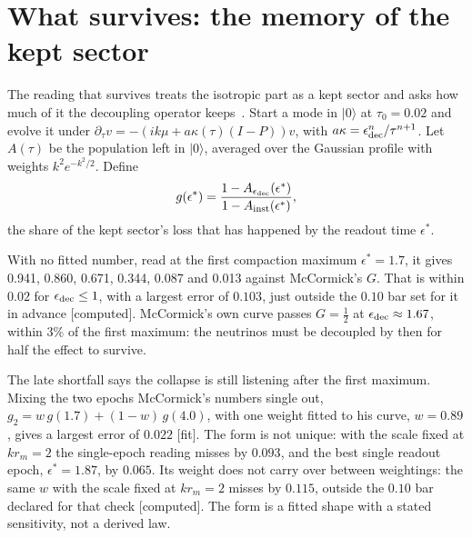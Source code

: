 \documentclass[11pt]{article}
\newcommand{\grade}[1]{\textsf{\small[#1]}}
\begin{document}
\section{What survives: the memory of the kept sector}\label{sec:memory}

The reading that survives treats the isotropic part as a kept sector and asks how much of it the decoupling operator keeps~\cite{WB}. Start a mode in $|0\rangle$ at $\tau_0=0.02$ and evolve it under $\partial_\tau v=-(ik\mu+a\kappa(\tau)(I-P))v$, with $a\kappa=\epsilon_{\rm dec}^n/\tau^{n+1}$. Let $A(\tau)$ be the population left in $|0\rangle$, averaged over the Gaussian profile with weights $k^2e^{-k^2/2}$. Define
\begin{equation}
g(\epsilon^\ast)=\frac{1-A_{\epsilon_{\rm dec}}(\epsilon^\ast)}{1-A_{\rm inst}(\epsilon^\ast)},
\end{equation}
the share of the kept sector's loss that has happened by the readout time $\epsilon^\ast$.

With no fitted number, read at the first compaction maximum $\epsilon^\ast=1.7$, it gives 0.941, 0.860, 0.671, 0.344, 0.087 and 0.013 against McCormick's $G$. That is within $0.02$ for $\epsilon_{\rm dec}\le1$, with a largest error of $0.103$, just outside the $0.10$ bar set for it in advance \grade{computed}. McCormick's own curve passes $G=\tfrac12$ at $\epsilon_{\rm dec}\approx1.67$, within 3\% of the first maximum: the neutrinos must be decoupled by then for half the effect to survive.

The late shortfall says the collapse is still listening after the first maximum. Mixing the two epochs McCormick's numbers single out, $g_2=w\,g(1.7)+(1-w)\,g(4.0)$, with one weight fitted to his curve, $w=0.89$, gives a largest error of $0.022$ \grade{fit}. The form is not unique: with the scale fixed at $kr_m=2$ the single-epoch reading misses by $0.093$, and the best single readout epoch, $\epsilon^\ast=1.87$, by $0.065$. Its weight does not carry over between weightings: the same $w$ with the scale fixed at $kr_m=2$ misses by $0.115$, outside the $0.10$ bar declared for that check \grade{computed}. The form is a fitted shape with a stated sensitivity, not a derived law.
\end{document}
